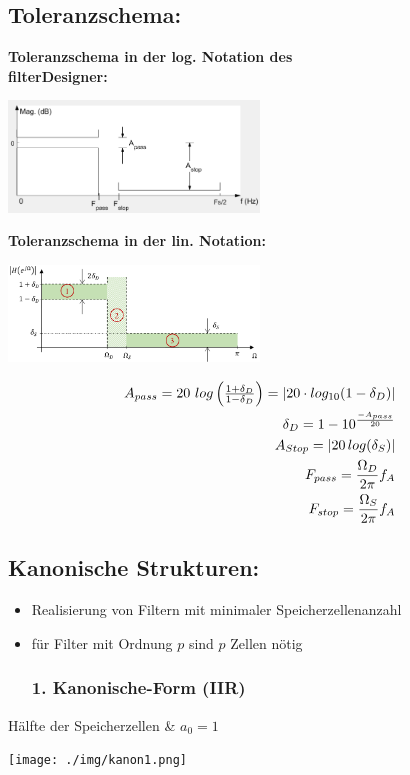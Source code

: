 \documentclass[10pt,a4paper]{article}
\begin{document}
\newpage
\subsection{Toleranzschema:}

\textbf{Toleranzschema in der log. Notation des \\ \grqq{}filterDesigner\grqq{}: }
  \begin{center}
      \includegraphics[width=0.5\textwidth]{./img/toleranzschema1.png}
  \end{center}

\textbf{Toleranzschema in der lin. Notation: }
  \begin{center}
    \includegraphics[width=0.5\textwidth]{./img/toleranzschema.png}
  \end{center}
  \begin{mdframed}[style=exercise]
    \begin{align}
      A_{pass}=20~log\left(\textstyle{\frac{1+\delta_{D}}{1-\delta_{D}}}\right)=\abs{20\cdot log_{10}(1-\delta_{D})}\\
      \delta_{D}= 1- 10^{\frac{-A_{pass}}{20}}\\
      A_{Stop}=\abs{20\,log(\delta_{S})}\\
      F_{pass}=\frac{\Omega_{D}}{2\pi}f_{A}\\
      F_{stop}=\frac{\Omega_{S}}{2\pi}f_{A}\\
    \end{align}
  \end{mdframed}
\subsection{Kanonische Strukturen: }
\begin{itemize}
  \item Realisierung von Filtern mit minimaler Speicherzellenanzahl
  \item für Filter mit Ordnung $p$ sind $p$ Zellen nötig
\subsubsection{1. Kanonische-Form (IIR)}
\end{itemize}
Hälfte der Speicherzellen \& $a_0=1$
  \begin{center}
      \texttt{[image: ./img/kanon1.png]}
  \end{center}
\end{document}
